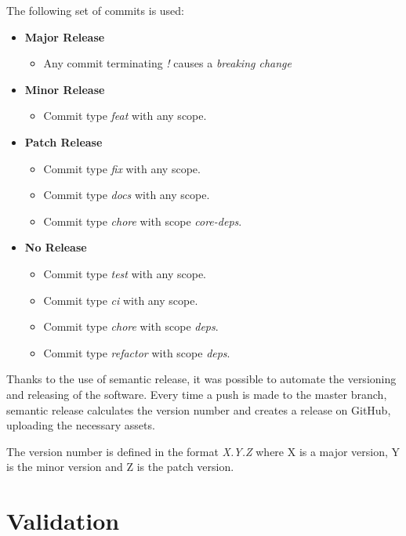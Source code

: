 \documentclass[12pt,a4paper,openright,twoside]{book}
\begin{document}
The following set of commits is used:
\begin{itemize}
  \item \textbf{Major Release} 
  \begin{itemize}
    \item Any commit terminating \textit{!} causes a \emph{breaking change}
  \end{itemize}

  \item \textbf{Minor Release} 
  \begin{itemize}
    \item Commit type \emph{feat} with any scope.
  \end{itemize}

  \item \textbf{Patch Release} 
  \begin{itemize}
    \item Commit type \emph{fix} with any scope.
    \item Commit type \emph{docs} with any scope.
    \item Commit type \emph{chore} with scope \textit{core-deps}.
  \end{itemize}

  \item \textbf{No Release} 
  \begin{itemize}
    \item Commit type \emph{test} with any scope.
    \item Commit type \emph{ci} with any scope.
    \item Commit type \emph{chore} with scope \textit{deps}.
    \item Commit type \emph{refactor} with scope \textit{deps}.
  \end{itemize}
\end{itemize}

Thanks to the use of semantic release, it was possible to automate the versioning and releasing of the software. 
Every time a push is made to the master branch, semantic release calculates the version number and creates a release on GitHub, uploading the necessary assets.

The version number is defined in the format \emph{X.Y.Z} where X is a major version, Y is the minor version and Z is the patch version.

\chapter{Validation}
\label{ch:validation}
\end{document}
